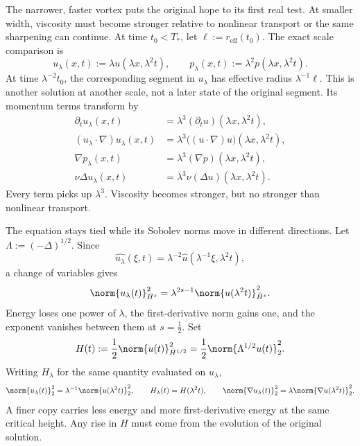 
The narrower, faster vortex puts the original hope to its first real test. At smaller width, viscosity must become stronger relative to nonlinear transport or the same sharpening can continue.
At time \(t_0<T_*\), let \(\ell:=r_{\mathrm{eff}}(t_0)\). The exact scale comparison is
\[
  u_\lambda(x,t)
  :=
  \lambda u(\lambda x,\lambda^2t),
  \qquad
  p_\lambda(x,t)
  :=
  \lambda^2p(\lambda x,\lambda^2t).
\]
At time \(\lambda^{-2}t_0\), the corresponding segment in \(u_\lambda\) has effective radius \(\lambda^{-1}\ell\). This is another solution at another scale, not a later state of the original segment. Its momentum terms transform by
\[
\begin{aligned}
  \partial_tu_\lambda(x,t)
  &=
  \lambda^3(\partial_tu)(\lambda x,\lambda^2t),
  \\
  (u_\lambda\cdot\nabla)u_\lambda(x,t)
  &=
  \lambda^3\bigl((u\cdot\nabla)u\bigr)(\lambda x,\lambda^2t),
  \\
  \nabla p_\lambda(x,t)
  &=
  \lambda^3(\nabla p)(\lambda x,\lambda^2t),
  \\
  \nu\Delta u_\lambda(x,t)
  &=
  \lambda^3\nu(\Delta u)(\lambda x,\lambda^2t).
\end{aligned}
\]
Every term picks up \(\lambda^3\). Viscosity becomes stronger, but no stronger than nonlinear transport.


The equation stays tied while its Sobolev norms move in different directions. Let \(\Lambda:=(-\Delta)^{1/2}\). Since
\[
  \widehat{u_\lambda}(\xi,t)
  =
  \lambda^{-2}\widehat u(\lambda^{-1}\xi,\lambda^2t),
\]
a change of variables gives
\[
  \norm{u_\lambda(t)}_{\dot H^s}^2
  =
  \lambda^{2s-1}
  \norm{u(\lambda^2t)}_{\dot H^s}^2.
\]
Energy loses one power of \(\lambda\), the first-derivative norm gains one, and the exponent vanishes between them at \(s=\tfrac12\). Set
\[
  H(t)
  :=
  \frac12\norm{u(t)}_{\dot H^{1/2}}^2
  =
  \frac12\norm{\Lambda^{1/2}u(t)}_2^2.
\]
Writing \(H_\lambda\) for the same quantity evaluated on \(u_\lambda\),
\[
  \norm{u_\lambda(t)}_2^2
  =
  \lambda^{-1}\norm{u(\lambda^2t)}_2^2,
  \qquad
  H_\lambda(t)=H(\lambda^2t),
  \qquad
  \norm{\nabla u_\lambda(t)}_2^2
  =
  \lambda\norm{\nabla u(\lambda^2t)}_2^2.
\]
A finer copy carries less energy and more first-derivative energy at the same critical height. Any rise in \(H\) must come from the evolution of the original solution.


